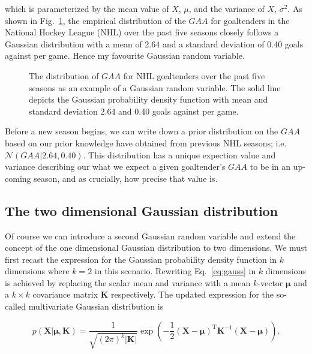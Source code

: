 \noindent which is parameterized by the mean value of $X$, $\mu$, and the variance
of $X$, $\sigma^2$. As shown in Fig.~\ref{fig:gaa1d}, the empirical distribution
of the $GAA$ for goaltenders in
the National Hockey League (NHL) over the past five seasons closely follows a
Gaussian distribution with a mean of 2.64 and a standard deviation of 0.40 goals
against per game. Hence my favourite Gaussian random variable. \\

\begin{figure}
  \centering
  \caption{The distribution of $GAA$ for NHL goaltenders over the past five
    seasons as an example of a Gaussian random variable. The solid line depicts
    the Gaussian probability density function with mean and standard
    deviation 2.64 and 0.40 goals against per game.}
  \label{fig:gaa1d}
\end{figure}

Before a new season begins, we can write down a prior distribution on the $GAA$
based on our prior knowledge have obtained from previous NHL seasons; i.e.
$\mathcal{N}(GAA|2.64,0.40)$. This distribution has a unique expection value and
variance describing our what we expect a given goaltender's $GAA$ to be in an
up-coming season, and as crucially, how precise that value is.

\subsection{The two dimensional Gaussian distribution}
Of course we can introduce a second Gaussian random variable and extend the 
concept of the one dimensional Gaussian distribution to two dimensions. We must
first recast the expression for the Gaussian probability density function in $k$
dimensions where $k=2$ in this scenario. Rewriting Eq.~\ref{eq:gauss} in $k$
dimensions is achieved by replacing the scalar mean and variance with a mean
$k$-vector $\boldsymbol{\mu}$ and a $k \times k$ covariance matrix $\mathbf{K}$
respectively. The updated expression for the so-called multivariate Gaussian
distribution is

\begin{equation}
  p(\mathbf{X}|\boldsymbol{\mu},\mathbf{K}) = \frac{1}{\sqrt{(2\pi)^k
      |\mathbf{K}|}} \exp{\left( -\frac{1}{2} (\mathbf{X} -
    \boldsymbol{\mu})^{\text{T}} \mathbf{K}^{-1} (\mathbf{X}-\boldsymbol{\mu})
    \right)}.
\end{equation}

